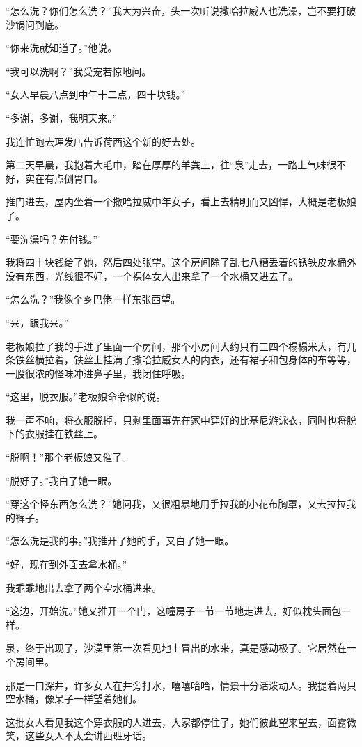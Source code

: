 \par “怎么洗？你们怎么洗？”我大为兴奋，头一次听说撒哈拉威人也洗澡，岂不要打破沙锅问到底。
\par “你来洗就知道了。”他说。
\par “我可以洗啊？”我受宠若惊地问。
\par “女人早晨八点到中午十二点，四十块钱。”
\par “多谢，多谢，我明天来。”
\par 我连忙跑去理发店告诉荷西这个新的好去处。
\par 第二天早晨，我抱着大毛巾，踏在厚厚的羊粪上，往“泉”走去，一路上气味很不好，实在有点倒胃口。
\par 推门进去，屋内坐着一个撒哈拉威中年女子，看上去精明而又凶悍，大概是老板娘了。
\par “要洗澡吗？先付钱。”
\par 我将四十块钱给了她，然后四处张望。这个房间除了乱七八糟丢着的锈铁皮水桶外没有东西，光线很不好，一个裸体女人出来拿了一个水桶又进去了。
\par “怎么洗？”我像个乡巴佬一样东张西望。
\par “来，跟我来。”
\par 老板娘拉了我的手进了里面一个房间，那个小房间大约只有三四个榻榻米大，有几条铁丝横拉着，铁丝上挂满了撒哈拉威女人的内衣，还有裙子和包身体的布等等，一股很浓的怪味冲进鼻子里，我闭住呼吸。
\par “这里，脱衣服。”老板娘命令似的说。
\par 我一声不响，将衣服脱掉，只剩里面事先在家中穿好的比基尼游泳衣，同时也将脱下的衣服挂在铁丝上。
\par “脱啊！”那个老板娘又催了。
\par “脱好了。”我白了她一眼。
\par “穿这个怪东西怎么洗？”她问我，又很粗暴地用手拉我的小花布胸罩，又去拉拉我的裤子。
\par “怎么洗是我的事。”我推开了她的手，又白了她一眼。
\par “好，现在到外面去拿水桶。”
\par 我乖乖地出去拿了两个空水桶进来。
\par “这边，开始洗。”她又推开一个门，这幢房子一节一节地走进去，好似枕头面包一样。
\par 泉，终于出现了，沙漠里第一次看见地上冒出的水来，真是感动极了。它居然在一个房间里。
\par 那是一口深井，许多女人在井旁打水，嘻嘻哈哈，情景十分活泼动人。我提着两只空水桶，像呆子一样望着她们。
\par 这批女人看见我这个穿衣服的人进去，大家都停住了，她们彼此望来望去，面露微笑，这些女人不太会讲西班牙话。
